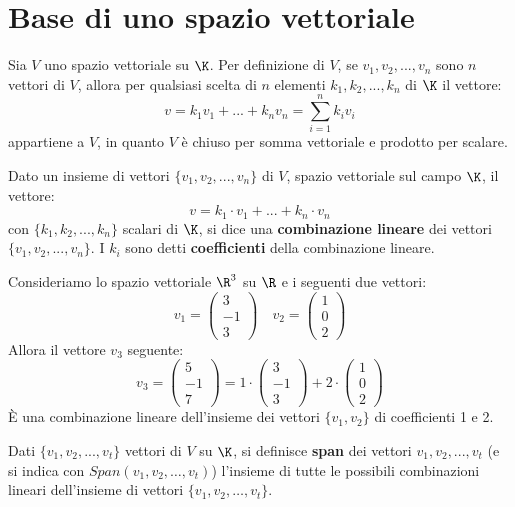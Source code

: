 \section{Base di uno spazio vettoriale}

Sia $V$ uno spazio vettoriale su $\K$. Per definizione di $V$, se
$v_1, v_2, ..., v_n$ sono $n$ vettori di $V$, allora per qualsiasi scelta di $n$
elementi $k_1, k_2, ..., k_n$ di $\K$ il vettore:
\[ v = k_1 v_1 + ... + k_n v_n = \sum_{i=1}^n k_i v_i \]
appartiene a $V$, in quanto $V$ è chiuso per somma vettoriale e prodotto per
scalare.

\begin{definition}
	Dato un insieme di vettori $\{v_1, v_2, ..., v_n\}$ di $V$, spazio
	vettoriale sul campo $\K$, il vettore:
	\[ v = k_1 \cdot v_1 + ... + k_n \cdot v_n \]
	con $\{k_1, k_2, ..., k_n\}$ scalari di $\K$, si dice una
	\textbf{combinazione lineare} dei vettori $\{v_1, v_2, ..., v_n\}$. I $k_i$
	sono detti \textbf{coefficienti} della combinazione lineare.
\end{definition}

\begin{example}
	Consideriamo lo spazio vettoriale $\R^3$ su $\R$ e i seguenti due vettori:
	\[
		v_1 = \begin{pmatrix}
			3 \\ -1 \\ 3
		\end{pmatrix}
		\quad
		v_2 = \begin{pmatrix}
			1 \\ 0 \\ 2
		\end{pmatrix}
	\]
	Allora il vettore $v_3$ seguente:
	\[
		v_3 = \begin{pmatrix}
			5 \\ -1 \\ 7
		\end{pmatrix}
		= 1 \cdot \begin{pmatrix}
			3 \\ -1 \\ 3
		\end{pmatrix}
		+ 2 \cdot \begin{pmatrix}
			1 \\ 0 \\ 2
		\end{pmatrix}
	\]
	È una combinazione lineare dell'insieme dei vettori $\{v_1, v_2\}$ di
	coefficienti 1 e 2.
\end{example}

\begin{definition}
	Dati $\{v_1, v_2, ..., v_t\}$ vettori di $V$ su $\K$, si definisce
	\textbf{span} dei vettori $v_1, v_2, ..., v_t$ (e si indica con
	$Span(v_1, v_2, \dots, v_t)$) l'insieme di tutte le possibili combinazioni
	lineari dell'insieme di vettori $\{v_1, v_2, \dots, v_t\}$.
\end{definition}

